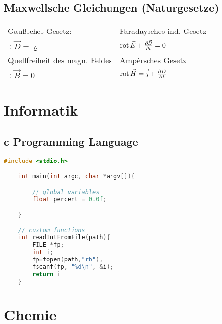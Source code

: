 \documentclass[english]{latex4ei/latex4ei_sheet}
\begin{document}
\begin{sectionbox}	
	\subsection{Maxwellsche Gleichungen (Naturgesetze)}
	\begin{emphbox}
		\begin{tabular}{ll}
			Gaußsches Gesetz: & Faradaysches ind. Gesetz\\
			\large $\div \vec D = \varrho $ & \large $\operatorname{rot} \vec E + \frac{\partial \vec B}{\partial t} = 0$ \\[1em]
			Quellfreiheit des magn. Feldes & Ampèrsches Gesetz\\
			\large $\div \vec B = 0$ & \large $\operatorname{rot} \vec H = \vec j + \frac{\partial \vec D}{\partial t}$\\[0.3em]
		\end{tabular}
	\end{emphbox}
\end{sectionbox}




\section{Informatik}


\begin{sectionbox}
	\subsection{c Programming Language}
	\begin{lstlisting}[language=C, gobble=4]
	#include <stdio.h>

	int main(int argc, char *argv[]){

		// global variables
		float percent = 0.0f;

	}

	// custom functions
	int readIntFromFile(path){
		FILE *fp;
		int i;
		fp=fopen(path,"rb");
		fscanf(fp, "%d\n", &i);
		return i
	}
	\end{lstlisting}
\end{sectionbox}


\section{Chemie}
\end{document}
